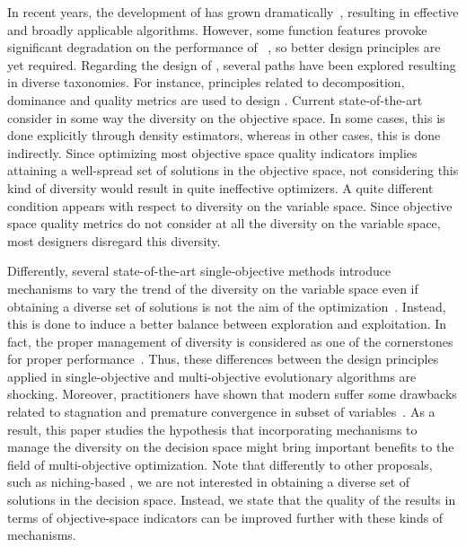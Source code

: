 %
In recent years, the development of \MOEAS{} has grown dramatically~\cite{van1998multiobjective, coello2007mop}, resulting 
in effective and broadly applicable algorithms.
%
However, some function features provoke significant degradation on the performance of \MOEAS{}~\cite{huband2006review}, 
so better design principles are yet required.
%
Regarding the design of \MOEAS{}, several paths have been explored resulting in diverse taxonomies.
%
For instance, principles related to decomposition, dominance and quality metrics are used
to design \MOEAS{}.
%
Current state-of-the-art \MOEAS{} consider in some way the diversity on the objective space.
%
In some cases, this is done explicitly through density estimators, %
whereas in other cases,
this is done indirectly. 
%
Since optimizing most objective space quality indicators implies attaining a well-spread set of solutions in the
objective space, not considering this kind of diversity would result in quite ineffective optimizers.
%
A quite different condition appears with respect to diversity on the variable space.
%
Since objective space quality metrics do not consider at all the diversity on the variable space,
most \MOEAS{} designers disregard this diversity.

Differently, %
several state-of-the-art single-objective methods introduce mechanisms to vary the trend of the 
diversity on the variable space even if obtaining a diverse
set of solutions is not the aim of the optimization~\cite{Joel:Crepinsek}.
%
Instead, this is done to induce a better balance between exploration and exploitation.
%
In fact, the proper management of diversity is considered as one of the cornerstones for proper performance~\cite{Herrera-Poyatos:17}.
%
Thus, these differences between the design principles applied in single-objective and multi-objective evolutionary 
algorithms are shocking.
%
Moreover, practitioners have shown that modern \MOEAS{} suffer some drawbacks related to stagnation and premature 
convergence in subset of variables~\cite{ishibuchi2006comparison, castillo2017multi, buche2003self, lu2002dynamic}.
%
As a result, this paper studies the hypothesis that incorporating mechanisms to manage the diversity on the decision space 
might bring important benefits to the field of multi-objective optimization.
%
Note that differently to other proposals, such as niching-based \MOEAS{}, we are not interested in obtaining
a diverse set of solutions in the decision space.
%
Instead, we state that the quality of the results in terms of objective-space indicators can be improved further with these
kinds of mechanisms.

